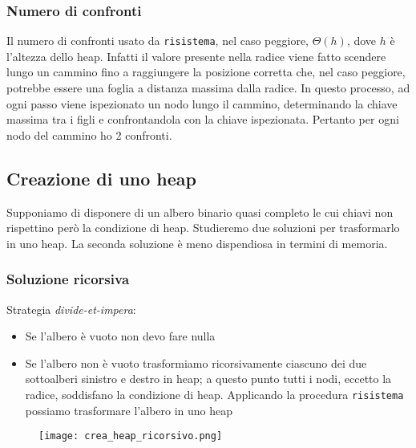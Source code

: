 \subsubsection*{Numero di confronti}
Il numero di confronti usato da \texttt{risistema}, nel caso peggiore, $\Theta(h)$,
dove $h$ è l'altezza dello heap. Infatti il valore presente nella radice viene fatto scendere
lungo un cammino fino a raggiungere la posizione corretta che, nel caso peggiore,
potrebbe essere una foglia a distanza massima dalla radice. In questo processo, ad ogni passo viene
ispezionato un nodo lungo il cammino, determinando la chiave massima tra i figli e 
confrontandola con la chiave ispezionata. Pertanto per ogni nodo del cammino ho 2 confronti.
\clearpage

\subsection{Creazione di uno heap}
Supponiamo di disponere di un albero binario quasi completo le cui chiavi non rispettino però
la condizione di heap. Studieremo due soluzioni per trasformarlo in uno heap. La seconda soluzione è meno dispendiosa in 
termini di memoria.
\subsubsection*{Soluzione ricorsiva}
Strategia \emph{divide-et-impera}:
\begin{itemize}
    \item Se l'albero è vuoto non devo fare nulla
    \item Se l'albero non è vuoto trasformiamo ricorsivamente ciascuno dei due 
    sottoalberi sinistro e destro in heap; a questo punto tutti i nodi, eccetto la radice,
    soddisfano la condizione di heap. Applicando la procedura \texttt{risistema} possiamo trasformare l'albero in uno heap
\end{itemize}
\begin{figure}[h]
    \texttt{[image: crea\_heap\_ricorsivo.png]}
\end{figure}

